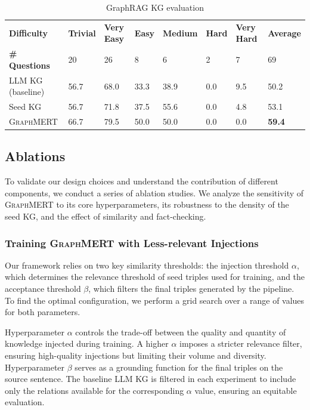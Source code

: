 \documentclass[10pt]{article}
\newcommand{\ours}{\textsc{GraphMERT}\xspace}
\begin{document}
\begin{table}[t!]
  \centering
  \caption{GraphRAG KG evaluation}
  \label{tab:graphrag}
  \small
  \begingroup
  \setlength{\tabcolsep}{6pt}
  \begin{tabular}{l p{1.3cm} p{1.3cm} p{1.3cm} p{1.3cm} p{1.3cm} p{1.3cm} p{1.3cm}}
    \toprule
    \rowcolor{gray!30}
    \textbf{Difficulty} & \textbf{Trivial} & \textbf{Very Easy} & \textbf{Easy} & \textbf{Medium} & \textbf{Hard} & \textbf{Very Hard} & \textbf{Average} \\
    \textbf{\# Questions} & 20 & 26 & 8 & 6 & 2 & 7 & 69 \\
    \midrule
    LLM KG (baseline) & 56.7 & 68.0 & 33.3 & 38.9 & 0.0 & 9.5 & 50.2 \\   
    Seed KG & 56.7 & 71.8 & 37.5 & 55.6 & 0.0 & 4.8 & 53.1 \\
    \ours & 66.7 & 79.5 & 50.0 & 50.0 & 0.0 & 0.0 & \textbf{59.4} \\   
    \bottomrule
  \end{tabular}
  \endgroup
\end{table}

\subsection{Ablations}
\label{subsec:ablation}
To validate our design choices and understand the contribution of different components, we conduct a series of ablation studies. We analyze the sensitivity of \ours to its core hyperparameters, its robustness to the density of the seed KG, and the effect of similarity and fact-checking.

\subsubsection{Training \ours with Less-relevant Injections}
\label{subsubsec:grid_search}
Our framework relies on two key similarity thresholds: the injection threshold $\alpha$, which determines the relevance threshold of seed triples used for training, and the acceptance threshold $\beta$, which filters the final triples generated by the pipeline. To find the optimal configuration, we perform a grid search over a range of values for both parameters.

Hyperparameter $\alpha$ controls the trade-off between the quality and quantity of knowledge injected during training. A higher $\alpha$ imposes a stricter relevance filter, ensuring high-quality injections but limiting their volume and diversity. Hyperparameter $\beta$ serves as a grounding function for the final triples on the source sentence. The baseline LLM KG is filtered in each experiment to include only the relations available for the corresponding $\alpha$ value, ensuring an equitable evaluation.
\end{document}
